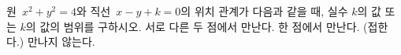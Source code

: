 원~$x^2+y^2=4$와 직선~$x-y+k=0$의 위치 관계가 다음과 같을 때, 실수 $k$의 값 또는 $k$의 값의 범위를 구하시오.
 서로 다른 두 점에서 만난다.
 한 점에서 만난다. (접한다.)
 만나지 않는다.
